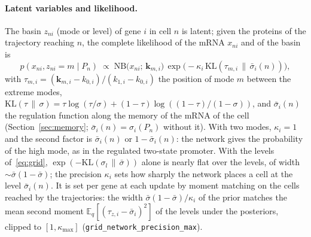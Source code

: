 \documentclass[a4paper, 11pt]{article}
\newcommand{\E}{\mathbb{E}}
\theoremstyle{plain}
\theoremstyle{remark}
\begin{document}
\paragraph{Latent variables and likelihood.} The basin $z_{ni}$ (mode or level) of gene $i$ in cell $n$ is latent; given the proteins of the trajectory reaching $n$, the complete likelihood of the mRNA $x_{ni}$ and of the basin is
\begin{equation}\label{eq:complete}
p(x_{ni}, z_{ni} = m \mid P_n) \;\propto\; \mathrm{NB}\bigl(x_{ni};\, \mathbf{k}_{m,i}\bigr)\, \exp\bigl(-\kappa_i\, \mathrm{KL}(\tau_{m,i} \,\|\, \bar\sigma_i(n))\bigr),
\end{equation}
with $\tau_{m,i} = (\mathbf{k}_{m,i} - k_{0,i})/(k_{1,i} - k_{0,i})$ the position of mode $m$ between the extreme modes, $\mathrm{KL}(\tau\,\|\,\sigma) = \tau\log(\tau/\sigma) + (1-\tau)\log((1-\tau)/(1-\sigma))$, and $\bar\sigma_i(n)$ the regulation function along the memory of the mRNA of the cell (Section~\ref{sec:memory}; $\bar\sigma_i(n) = \sigma_i(P_n)$ without it). With two modes, $\kappa_i = 1$ and the second factor is $\bar\sigma_i(n)$ or $1 - \bar\sigma_i(n)$: the network gives the probability of the high mode, as in the regulated two-state promoter. With the levels of~\eqref{eq:grid}, $\exp(-\mathrm{KL}(\sigma_l \,\|\, \bar\sigma))$ alone is nearly flat over the levels, of width $\sim\bar\sigma(1 - \bar\sigma)$; the precision $\kappa_i$ sets how sharply the network places a cell at the level $\bar\sigma_i(n)$. It is set per gene at each update by moment matching on the cells reached by the trajectories: the width $\bar\sigma(1-\bar\sigma)/\kappa_i$ of the prior matches the mean second moment $\E_q[(\tau_{z,i} - \bar\sigma_i)^2]$ of the levels under the posteriors, clipped to $[1, \kappa_{\max}]$ (\texttt{grid\_network\_precision\_max}).
\end{document}
